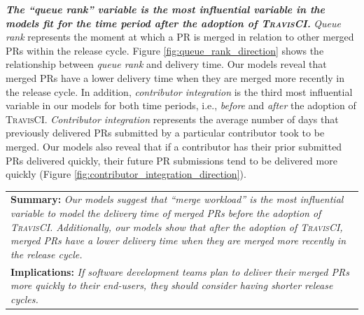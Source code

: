 \textit{\textbf{The ``queue rank'' variable is the most influential variable in
the models fit for the time period \textit{after} the adoption of \textsc{TravisCI}.}} \textit{Queue rank}
represents the moment at which a PR is merged in relation to other merged PRs within the
release cycle. Figure \ref{fig:queue_rank_direction} shows the relationship
between \textit{queue rank} and delivery time. Our models reveal that
merged PRs have a lower delivery time when they are merged more recently in the
release cycle. In addition, \textit{contributor integration} is the third most
influential variable in our models for both time periods, i.e., \textit{before} and
\textit{after} the adoption of \textsc{TravisCI}. {\em Contributor integration} represents the
average number of days that previously delivered PRs submitted by a
particular contributor took to be merged. Our models also reveal that if a contributor has
their prior submitted PRs delivered quickly, their future PR submissions tend
to be delivered more quickly (Figure
\ref{fig:contributor_integration_direction}).

\begin{center}
	\begin{tabular}{|p{}|}
		\hline
		\textbf{Summary:}
		\textit{Our models suggest that ``merge workload'' is the most
			influential variable to model the delivery time of merged PRs
			\textit{before} the adoption of \textsc{TravisCI}. Additionally, our
			models show that after the adoption of \textsc{TravisCI}, merged PRs have a lower delivery time when they are merged more recently in the release cycle.} \\
		\textbf{Implications:}
		\textit{If software development teams plan to deliver their merged PRs more quickly to their end-users, they should consider having shorter release cycles.}
		\\
		\hline
	\end{tabular}
\end{center}

